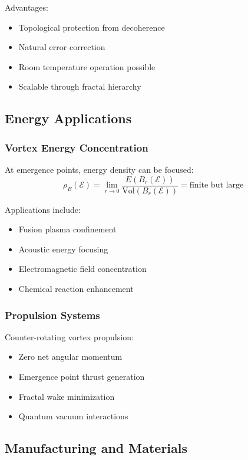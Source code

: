 \documentclass[12pt]{article}
\newcommand{\emergencept}{\mathcal{E}}
\begin{document}
Advantages:
\begin{itemize}
\item Topological protection from decoherence
\item Natural error correction
\item Room temperature operation possible
\item Scalable through fractal hierarchy
\end{itemize}

\subsection{Energy Applications}

\subsubsection{Vortex Energy Concentration}

At emergence points, energy density can be focused:
\begin{equation}
\rho_E(\emergencept) = \lim_{r \to 0} \frac{E(B_r(\emergencept))}{\text{Vol}(B_r(\emergencept))} = \text{finite but large}
\end{equation}

Applications include:
\begin{itemize}
\item Fusion plasma confinement
\item Acoustic energy focusing
\item Electromagnetic field concentration
\item Chemical reaction enhancement
\end{itemize}

\subsubsection{Propulsion Systems}

Counter-rotating vortex propulsion:
\begin{itemize}
\item Zero net angular momentum
\item Emergence point thrust generation
\item Fractal wake minimization
\item Quantum vacuum interactions
\end{itemize}

\subsection{Manufacturing and Materials}
\end{document}
